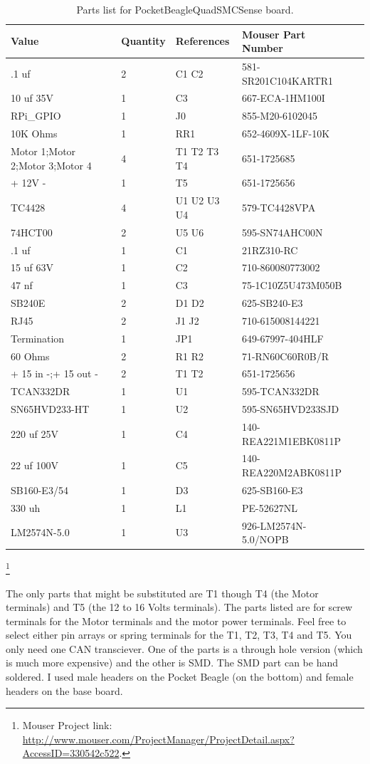 \begin{table}[htdp]
\begin{centering}\begin{tabular}{|l|l|p{1in}|l|p{.5in}|}
\hline
Value&Quantity&References&Mouser Part Number \\
\hline
.1 uf&2&C1 C2&581-SR201C104KARTR1 \\
\hline
10 uf 35V&1&C3&667-ECA-1HM100I \\
\hline
RPi\_GPIO&1&J0&855-M20-6102045 \\
\hline
10K Ohms&1&RR1&652-4609X-1LF-10K \\
\hline
Motor 1;Motor 2;Motor 3;Motor 4&4&T1 T2 T3 T4&651-1725685 \\
\hline
+ 12V -&1&T5&651-1725656 \\
\hline
TC4428&4&U1 U2 U3 U4&579-TC4428VPA \\
\hline
74HCT00&2&U5 U6&595-SN74AHC00N \\
\hline
.1 uf&1&C1&21RZ310-RC\\
\hline
15 uf 63V&1&C2&710-860080773002\\
\hline
47 nf&1&C3&75-1C10Z5U473M050B\\
\hline
SB240E&2&D1 D2&625-SB240-E3\\
\hline
RJ45&2&J1 J2&710-615008144221\\
\hline
Termination&1&JP1&649-67997-404HLF\\
\hline
60 Ohms&2&R1 R2&71-RN60C60R0B/R\\
\hline
+ 15 in -;+ 15 out -&2&T1 T2&651-1725656\\
\hline
TCAN332DR&1&U1&595-TCAN332DR\\
\hline
SN65HVD233-HT&1&U2&595-SN65HVD233SJD\\
\hline
220 uf 25V&1&C4&140-REA221M1EBK0811P\\
\hline
22 uf 100V&1&C5&140-REA220M2ABK0811P\\
\hline
SB160-E3/54&1&D3&625-SB160-E3\\
\hline
330 uh&1&L1&PE-52627NL\\
\hline
LM2574N-5.0&1&U3&926-LM2574N-5.0/NOPB\\
\hline
\end{tabular}
\caption{Parts list for PocketBeagleQuadSMCSense board.}
\end{centering}\end{table}\footnote{Mouser Project link: 
\url{http://www.mouser.com/ProjectManager/ProjectDetail.aspx?AccessID=330542c522}.}


The only parts that might be substituted are T1 though T4 (the Motor
terminals) and T5 (the 12 to 16 Volts terminals). The parts listed are for
screw terminals for the Motor terminals and the motor power terminals. Feel
free to select either pin arrays or spring terminals for the T1, T2, T3, T4
and T5.  You only need one CAN transciever.  One of the parts is a through 
hole version (which is much more expensive) and the other is SMD.  The SMD 
part can be hand soldered.  I used male headers on the Pocket Beagle (on the 
bottom) and female headers on the base board.

